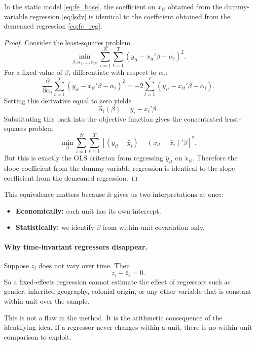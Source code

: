 \begin{thmN}
In the static model \eqref{eq:fe_base}, the coefficient on $x_{it}$ obtained from the dummy-variable regression \eqref{eq:lsdv} is identical to the coefficient obtained from the demeaned regression \eqref{eq:fe_reg}.
\end{thmN}

\begin{proof}
Consider the least-squares problem
\[
\min_{\beta,\alpha_1,\ldots,\alpha_N}
\sum_{i=1}^N \sum_{t=1}^T
\left(y_{it}-x_{it}'\beta-\alpha_i\right)^2.
\]
For a fixed value of $\beta$, differentiate with respect to $\alpha_i$:
\[
\frac{\partial}{\partial \alpha_i}
\sum_{t=1}^T \left(y_{it}-x_{it}'\beta-\alpha_i\right)^2
= -2\sum_{t=1}^T \left(y_{it}-x_{it}'\beta-\alpha_i\right).
\]
Setting this derivative equal to zero yields
\[
\hat{\alpha}_i(\beta)=\bar{y}_i-\bar{x}_i'\beta.
\]
Substituting this back into the objective function gives the concentrated least-squares problem
\[
\min_{\beta}
\sum_{i=1}^N \sum_{t=1}^T
\left[(y_{it}-\bar{y}_i) - (x_{it}-\bar{x}_i)'\beta\right]^2.
\]
But this is exactly the \ac{OLS} criterion from regressing $\ddot{y}_{it}$ on $\ddot{x}_{it}$. Therefore the slope coefficient from the dummy-variable regression is identical to the slope coefficient from the demeaned regression.
\end{proof}

This equivalence matters because it gives us two interpretations at once:
\begin{itemize}
\item \textbf{Economically:} each unit has its own intercept.
\item \textbf{Statistically:} we identify $\beta$ from within-unit covariation only.
\end{itemize}

\paragraph{Why time-invariant regressors disappear.}
Suppose $z_i$ does not vary over time. Then
\[
z_i-\bar{z}_i=0.
\]
So a fixed-effects regression cannot estimate the effect of regressors such as gender, inherited geography, colonial origin, or any other variable that is constant within unit over the sample.

This is not a flaw in the method. It is the arithmetic consequence of the identifying idea. If a regressor never changes within a unit, there is no within-unit comparison to exploit.

